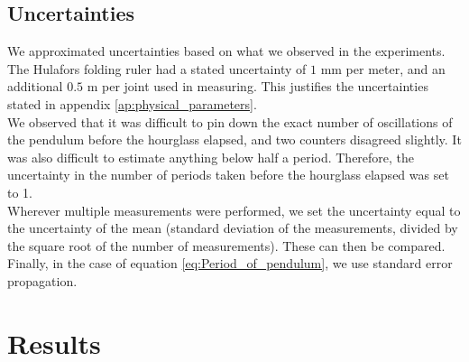 \documentclass[a4paper, 10pt]{article}
\begin{document}
\subsection{Uncertainties}
We approximated uncertainties based on what we observed in the experiments.\\
\linebreak
The Hulafors folding ruler had a stated uncertainty of $1$ mm per meter, and an additional $0.5$ m per joint used in measuring. This justifies the uncertainties stated in appendix \ref{ap:physical_parameters}.
\\
\linebreak
We observed that it was difficult to pin down the exact number of oscillations of the pendulum before the hourglass elapsed, and two counters disagreed slightly. It was also difficult to estimate anything below half a period. Therefore, the uncertainty in the number of periods taken before the hourglass elapsed was set to 1.\\
\linebreak
Wherever multiple measurements were performed, we set the uncertainty equal to the uncertainty of the mean (standard deviation of the measurements, divided by the square root of the number of measurements). These can then be compared.\\
\linebreak
Finally, in the case of equation \ref{eq:Period_of_pendulum}, we use standard error propagation. 
\section{Results}
\end{document}
